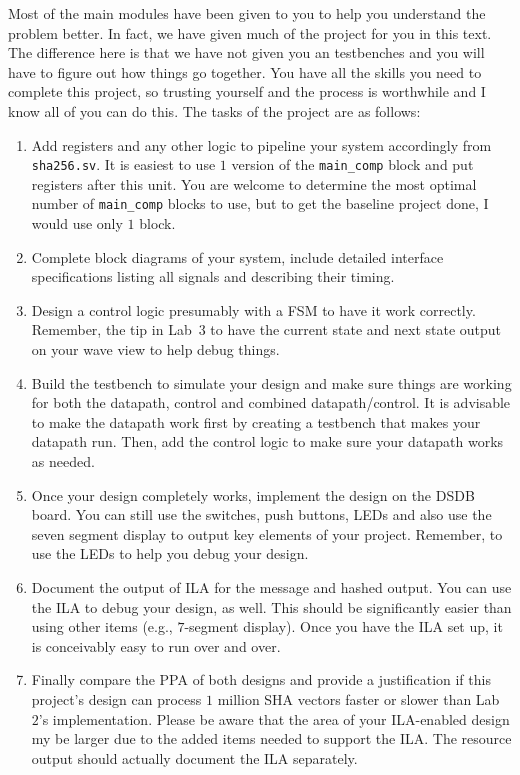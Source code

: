 \documentclass{article}
\begin{document}
Most of the main modules have been given to you to help you understand the
problem better.   In fact, we have given much of the project for you
in this text.  The difference here is that we have not given you an
testbenches and you will have to figure out how things go together.
You have all the skills you need to complete this project, so trusting
yourself and the process is worthwhile and I know all of you can do
this.  The tasks of the project are as follows:
\begin{enumerate}
  \item Add registers and any other logic to pipeline your system
    accordingly from \verb!sha256.sv!.  It is easiest to use $1$
    version of the \verb!main_comp! block and put registers after this
    unit.  You are welcome to determine the most optimal number of
    \verb!main_comp! blocks to use, but to get the baseline project
    done, I would use only $1$ block.
  \item Complete block diagrams of your system, include detailed
    interface specifications listing all signals and describing their
    timing.
  \item Design a control logic presumably with a FSM to have it work
  correctly.  Remember, the tip in Lab~$3$ to have the current state and next
  state output on your wave view to help debug things.
\item  Build the testbench to simulate your design and make sure
  things are working for both the datapath, control and combined
  datapath/control. It is advisable to make the datapath work first by
  creating a testbench that makes your datapath run.  Then, add the
  control logic to make sure your datapath works as needed.
  \item Once your design completely works, implement the design on
    the DSDB board.  You can still use the switches, push
    buttons, LEDs and also use the
    seven segment display to output key elements of your project.
    Remember, to use the LEDs to help you debug your design.
  \item Document the output of ILA for the message and hashed output.
    You can use the ILA to debug your design, as well.  This should be
    significantly easier than using other items (e.g., $7$-segment
    display).  Once you have the ILA set up, it is conceivably easy to
    run over and over.
  \item Finally compare the PPA of both designs and provide a
    justification if this project's design can process $1$ million SHA
    vectors faster or slower than Lab~$2$'s implementation.  Please be
    aware that the area of your ILA-enabled design my be larger due to
    the added items needed to support the ILA.  The resource output
    should actually document the ILA separately.  
\end{enumerate}
\end{document}
